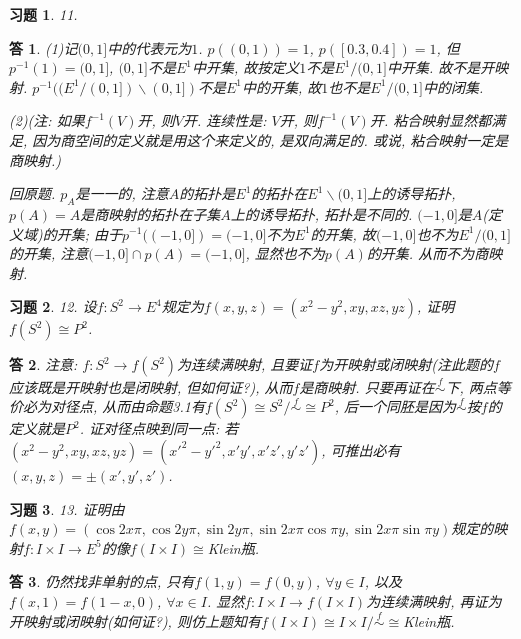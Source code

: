\documentclass{ctexart}%
\newtheorem*{exercise}{习题}
\newtheorem*{solution}{答}
\theoremstyle{definition}
\theoremstyle{remark}
\begin{document}
\begin{exercise}11. 
\end{exercise}
\begin{solution}
(1)记$(0,1]$中的代表元为$1$. $p((0,1))=1$, $p([0.3,0.4])=1$, 但$p^{-1}(1)=(0,1]$, $(0,1]$不是$E^1$中开集, 故按定义$1$不是$E^1\slash (0,1]$中开集. 故不是开映射. $p^{-1}((E^1\slash(0,1])\backslash(0,1])$不是$E^1$中的开集, 故$1$也不是$E^1\slash (0,1]$中的闭集. 

(2)(注: 如果$f^{-1}(V)$开, 则$V$开. 连续性是: $V$开, 则$f^{-1}(V)$开. 粘合映射显然都满足, 因为商空间的定义就是用这个来定义的, 是双向满足的. 或说, 粘合映射一定是商映射.) 

回原题. $p_A$是一一的, 注意$A$的拓扑是$E^1$的拓扑在$E^1\backslash (0,1]$上的诱导拓扑, $p(A)=A$是商映射的拓扑在子集$A$上的诱导拓扑, 拓扑是不同的. $(-1,0]$是$A$(定义域)的开集; 由于$p^{-1}((-1,0])=(-1,0]$不为$E^1$的开集, 故$(-1,0]$也不为$E^1\slash(0,1]$的开集, 注意$(-1,0]\cap p(A)=(-1,0]$, 显然也不为$p(A)$的开集. 从而不为商映射. 
\end{solution}

\begin{exercise}12. 设$f: S^2\rightarrow E^4$规定为$f(x,y,z)=(x^2-y^2,xy,xz,yz)$, 证明$f(S^2)\cong P^2$.
\end{exercise}
\begin{solution}
注意: $f: S^2\rightarrow f(S^2)$为连续满映射, 且要证$f$为开映射或闭映射(注此题的$f$应该既是开映射也是闭映射, 但如何证?), 从而$f$是商映射. 只要再证在$\overset{f}{\sim}$下, 两点等价必为对径点, 从而由命题3.1有$f(S^2)\cong S^2\slash \overset{f}{\sim}\cong P^2$, 后一个同胚是因为$\overset{f}{\sim}$按$f$的定义就是$P^2$. 证对径点映到同一点: 
若$(x^2-y^2,xy,xz,yz)=(x'^2-y'^2,x'y',x'z',y'z')$, 可推出必有$(x,y,z)=\pm(x',y',z')$.  
\end{solution}

\begin{exercise}13. 证明由$f(x,y)=(\cos2x\pi,\cos 2y \pi, \sin2y\pi, \sin2x\pi\cos \pi y, \sin2x \pi \sin \pi y)$规定的映射$f: I\times I \rightarrow E^5$的像$f(I\times I) \cong $Klein瓶.
\end{exercise}
\begin{solution}
仍然找非单射的点, 只有$f(1,y)=f(0,y)$, $\forall y\in I$, 以及$f(x, 1)=f(1-x, 0)$, $\forall x\in I$. 显然$f: I\times I\rightarrow f(I\times I)$为连续满映射, 再证为开映射或闭映射(如何证?), 则仿上题知有$f(I\times I)\cong I\times I\slash \overset{f}{\sim}\cong$Klein瓶.
 \end{solution}
 
\end{document}
